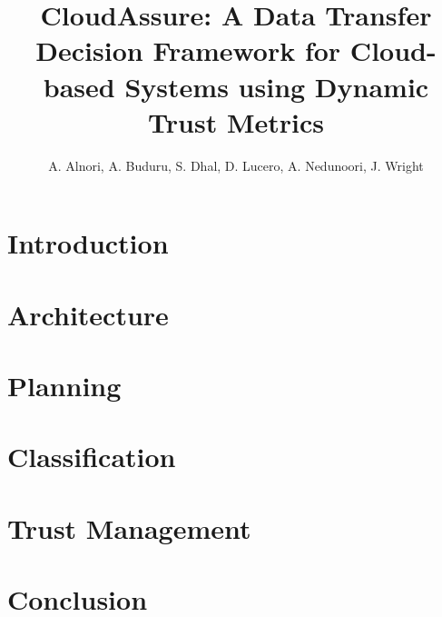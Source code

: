 \documentclass[12pt,a4paper]{report}
\title{CloudAssure: A Data Transfer Decision Framework for 
Cloud-based Systems using Dynamic Trust 
Metrics}
\author{A. Alnori, A. Buduru, S. Dhal, D. Lucero, A. Nedunoori, J. Wright}
\begin{document}
\maketitle
\tableofcontents
\clearpage
\chapter{Introduction}


\chapter{Architecture}


\chapter{Planning}


\chapter{Classification}


\chapter{Trust Management}


\chapter{Conclusion}


\clearpage
\printbibliography
\end{document}
